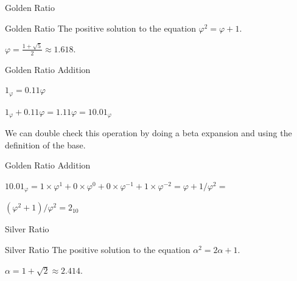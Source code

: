 \documentclass{beamer}
\begin{document}
            \begin{frame}{Golden Ratio}
              \begin{block}{Golden Ratio}
                The positive solution to the equation $\varphi^2 = \varphi + 1$.

                $\varphi = \frac{1+\sqrt{5}}{2} \approx 1.618$.
              \end{block}
            \end{frame}

            \begin{frame}{Golden Ratio Addition}
              \begin{example}
                $1_\varphi = 0.11\varphi$

                $1_\varphi + 0.11\varphi = 1.11\varphi = 10.01_\varphi$

                We can double check this operation by doing a beta expansion and using the definition of the base.
              \end{example}
            \end{frame}

            \begin{frame}{Golden Ratio Addition}
              \begin{example}
                $10.01_\varphi = 1\times\varphi^1+0\times\varphi^0+0\times\varphi^{-1}+1\times\varphi^{-2}=\varphi + 1/\varphi^2 =$

                $(\varphi^2 + 1)/\varphi^2 = 2_{10}$
              \end{example}
            \end{frame}


            \begin{frame}{Silver Ratio}
              \begin{block}{Silver Ratio}
                The positive solution to the equation $\alpha^2 = 2\alpha + 1$.

                $\alpha = 1+\sqrt{2} \approx 2.414$.
              \end{block}
            \end{frame}













\end{document}
